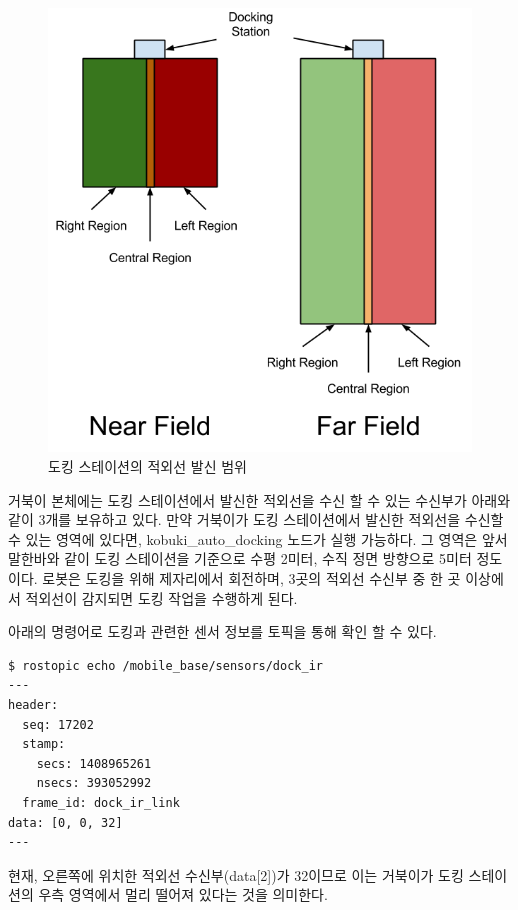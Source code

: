 \begin{figure}[h]
\centering\includegraphics[width=0.8\columnwidth]{pictures/chapter10/docking_region.png}
\caption{도킹 스테이션의 적외선 발신 범위}
\end{figure}

거북이 본체에는 도킹 스테이션에서 발신한 적외선을 수신 할 수 있는 수신부가 아래와 같이 3개를 보유하고 있다. 만약 거북이가 도킹 스테이션에서 발신한 적외선을 수신할 수 있는 영역에 있다면, kobuki\_auto\_docking 노드가 실행 가능하다. 그 영역은 앞서 말한바와 같이 도킹 스테이션을 기준으로 수평 2미터, 수직 정면 방향으로 5미터 정도이다. 로봇은 도킹을 위해 제자리에서 회전하며, 3곳의 적외선 수신부 중 한 곳 이상에서 적외선이 감지되면 도킹 작업을 수행하게 된다. 

아래의 명령어로 도킹과 관련한 센서 정보를 토픽을 통해 확인 할 수 있다.

\vspace{\baselineskip}
\begin{lstlisting}[language=ROS]
$ rostopic echo /mobile_base/sensors/dock_ir
---
header: 
  seq: 17202
  stamp: 
    secs: 1408965261
    nsecs: 393052992
  frame_id: dock_ir_link
data: [0, 0, 32]
---
\end{lstlisting}


현재, 오른쪽에 위치한 적외선 수신부(data[2])가 32이므로 이는 거북이가 도킹 스테이션의 우측 영역에서 멀리 떨어져 있다는 것을 의미한다.


